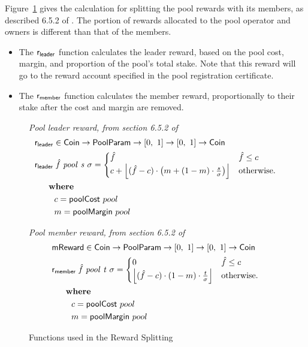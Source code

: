 \clearpage

Figure~\ref{fig:functions:reward-splitting} gives the calculation for
splitting the pool rewards with its members, as described 6.5.2 of \cite{delegation_design}.
The portion of rewards allocated to the pool operator and owners is different
than that of the members.

\begin{itemize}
  \item The $\fun{r_{leader}}$ function calculates the leader reward, based on the pool cost,
    margin, and proportion of the pool's total stake.  Note that this reward will go to the
    reward account specified in the pool registration certificate.
  \item The $\fun{r_{member}}$ function calculates the member reward, proportionally to their
    stake after the cost and margin are removed.
\end{itemize}

\begin{figure}[htb]
  \emph{Pool leader reward, from section 6.5.2 of \cite{delegation_design}}
  \begin{align*}
      & \fun{r_{leader}} \in \Coin \to \PoolParam \to \unitInterval \to \unitInterval \to \Coin \\
      & \lReward{\hat{f}}{pool}{s}{\sigma} =
        \begin{cases}
        \hat{f} & \hat{f} \leq c\\
        c + \floor*{(\hat{f} - c)\cdot\left(m + (1-m)\cdot\frac{s}{\sigma}\right) }&
        \text{otherwise.}
      \end{cases} \\
      & ~~~\where \\
      & ~~~~~~~c = \fun{poolCost}~pool \\
      & ~~~~~~~m = \fun{poolMargin}~pool \\
  \end{align*}

  \emph{Pool member reward, from section 6.5.2 of \cite{delegation_design}}
  \begin{align*}
    & \fun{mReward} \in \Coin \to \PoolParam \to \unitInterval \to \unitInterval \to \Coin \\
    & \mReward{\hat{f}}{pool}{t}{\sigma} =
      \begin{cases}
        0 & \hat{f} \leq c\\
        \floor*{(\hat{f} - c)\cdot(1-m)\cdot\frac{t}{\sigma}} &
        \text{otherwise.}
      \end{cases} \\
    & ~~~\where \\
    & ~~~~~~~c = \fun{poolCost}~pool \\
    & ~~~~~~~m = \fun{poolMargin}~pool \\
  \end{align*}

  \caption{Functions used in the Reward Splitting}
  \label{fig:functions:reward-splitting}
\end{figure}


